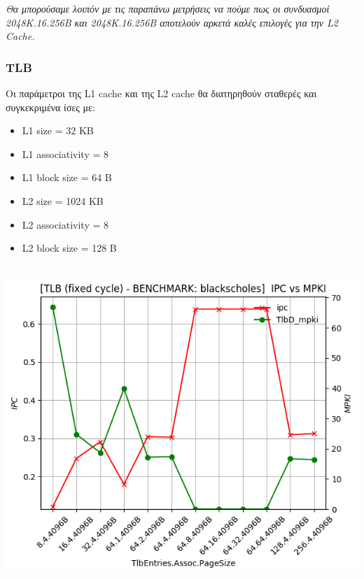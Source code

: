 \textit{Θα μπορούσαμε λοιπόν με τις παραπάνω μετρήσεις να πούμε πως οι συνδυασμοί
2048Κ.16.256Β και 2048Κ.16.256Β αποτελούν αρκετά καλές επιλογές για την \textlatin{L2 Cache}.}

\newpage


\subsubsection{TLB}
Οι παράμετροι της \textlatin{L1 cache} και της \textlatin{L2 cache} θα
διατηρηθούν σταθερές και συγκεκριμένα ίσες με:

\begin{multicols}{2}
    \begin{itemize}
        \item L1 size = 32 KB  
        \item L1 associativity = 8
        \item L1 block size = 64 B
        \item L2 size = 1024 KB  
        \item L2 associativity = 8
        \item L2 block size = 128 B
    \end{itemize}
\end{multicols}


\vspace{2cm}
\begin{minipage}{\textwidth}
    \begin{center}
        \\
        \vspace{3mm}
        \includegraphics[scale=0.70]{graphs/TLB/fixed/blackscholes.png}
        \vspace{6mm}
    \end{center}
\end{minipage}


